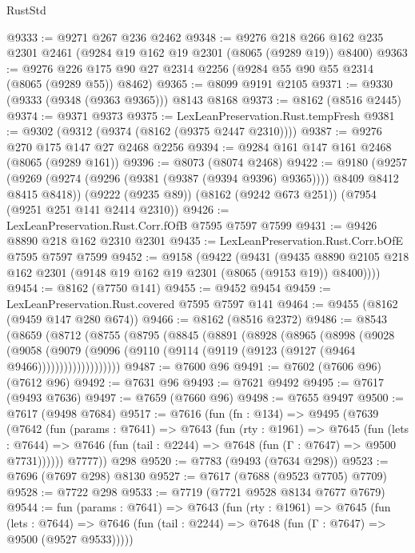 \begin{lexlean}{RustStd}
\begin{coremodule}
@9333 := @9271 @267 @236 @2462
@9348 := @9276 @218 @266 @162 @235 @2301 @2461 (@9284 @19 @162 @19 @2301 (@8065 (@9289 @19)) @8400)
@9363 := @9276 @226 @175 @90 @27 @2314 @2256 (@9284 @55 @90 @55 @2314 (@8065 (@9289 @55)) @8462)
@9365 := @8099 @9191 @2105
@9371 := @9330 (@9333 (@9348 (@9363 @9365))) @8143 @8168
@9373 := @8162 (@8516 @2445)
@9374 := @9371 @9373
@9375 := LexLeanPreservation.Rust.tempFresh
@9381 := @9302 (@9312 (@9374 (@8162 (@9375 @2447 @2310))))
@9387 := @9276 @270 @175 @147 @27 @2468 @2256
@9394 := @9284 @161 @147 @161 @2468 (@8065 (@9289 @161))
@9396 := @8073 (@8074 @2468)
@9422 := @9180
    (@9257 (@9269 (@9274 (@9296 (@9381 (@9387 (@9394 @9396) @9365)))) @8409 @8412 @8415 @8418))
    (@9222 (@9235 @89))
    (@8162 (@9242 @673 @251))
    (@7954 (@9251 @251 @141 @2414 @2310))
@9426 := LexLeanPreservation.Rust.Corr.fOfB @7595 @7597 @7599
@9431 := @9426 @8890 @218 @162 @2310 @2301
@9435 := LexLeanPreservation.Rust.Corr.bOfE @7595 @7597 @7599
@9452 := @9158
    (@9422
      (@9431
        (@9435 @8890 @2105 @218 @162 @2301 (@9148 @19 @162 @19 @2301 (@8065 (@9153 @19)) @8400))))
@9454 := @8162 (@7750 @141)
@9455 := @9452 @9454
@9459 := LexLeanPreservation.Rust.covered @7595 @7597 @141
@9464 := @9455 (@8162 (@9459 @147 @280 @674))
@9466 := @8162 (@8516 @2372)
@9486 := @8543
    (@8659
      (@8712
        (@8755
          (@8795
            (@8845
              (@8891
                (@8928
                  (@8965
                    (@8998
                      (@9028
                        (@9058
                          (@9079
                            (@9096
                              (@9110 (@9114 (@9119 (@9123 (@9127 (@9464 @9466)))))))))))))))))))
@9487 := @7600 @96
@9491 := @7602 (@7606 @96) (@7612 @96)
@9492 := @7631 @96
@9493 := @7621 @9492
@9495 := @7617 (@9493 @7636)
@9497 := @7659 (@7660 @96)
@9498 := @7655 @9497
@9500 := @7617 (@9498 @7684)
@9517 := @7616
    (fun (fn : @134) =>
    @9495
      (@7639
        (@7642
          (fun (params : @7641) =>
          @7643
            (fun (rty : @1961) =>
            @7645
              (fun (lets : @7644) =>
              @7646 (fun (tail : @2244) => @7648 (fun (Γ : @7647) => @9500 @7731))))))
        @7777))
    @298
@9520 := @7783 (@9493 (@7634 @298))
@9523 := @7696 (@7697 @298) @8130
@9527 := @7617 (@7688 (@9523 @7705) @7709)
@9528 := @7722 @298
@9533 := @7719 (@7721 @9528 @8134 @7677 @7679)
@9544 := fun (params : @7641) =>
  @7643
    (fun (rty : @1961) =>
    @7645
      (fun (lets : @7644) =>
      @7646 (fun (tail : @2244) => @7648 (fun (Γ : @7647) => @9500 (@9527 @9533)))))

\end{coremodule}
\end{lexlean}
